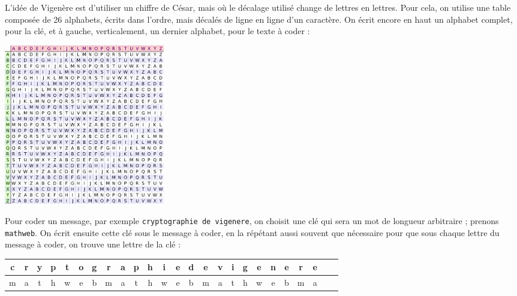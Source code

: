 \documentclass[t,11pt]{article}
\begin{document}
\enteteinfo

L'idée de Vigenère est d'utiliser un chiffre de César, mais où le décalage utilisé change de lettres en lettres. Pour cela, on utilise une table composée de 26 alphabets, écrits dans l'ordre, mais décalés de ligne en ligne d'un caractère. On écrit encore en haut un alphabet complet, pour la clé, et à gauche, verticalement, un dernier alphabet, pour le texte à coder : 

\begin{center}\includegraphics[width=7cm]{vigenere.png}\end{center}

Pour coder un message, par exemple  \texttt{cryptographie de vigenere}, on choisit une clé qui sera un mot de longueur arbitraire ; prenons \texttt{mathweb}. On écrit ensuite cette clé sous le message à coder, en la répétant aussi souvent que nécessaire pour que sous chaque lettre du message à coder, on trouve une lettre de la clé :  
\begin{center}
\begin{tabular}{|*{25}{c|}}
\hline
c&r&y&p&t&o&g&r&a&p&h&i&e&d&e&v&i&g&e&n&e&r&e\\
\hline
m&a&t&h&w&e&b&m&a&t&h&w&e&b&m&a&t&h&w&e&b&m&a\\
\hline
\end{tabular}
\end{center}

~\newline
\end{document}
